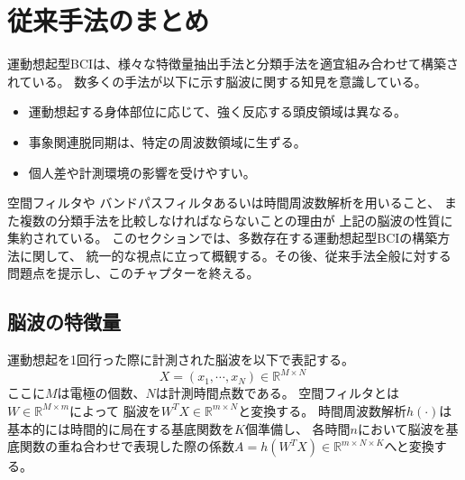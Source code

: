 \section{従来手法のまとめ}
運動想起型BCIは、様々な特徴量抽出手法と分類手法を適宜組み合わせて構築されている。
数多くの手法が以下に示す脳波に関する知見を意識している。
\begin{itemize}
    \item 運動想起する身体部位に応じて、強く反応する頭皮領域は異なる。
    \item 事象関連脱同期は、特定の周波数領域に生ずる。
    \item 個人差や計測環境の影響を受けやすい。
\end{itemize}
空間フィルタや
バンドパスフィルタあるいは時間周波数解析を用いること、
また複数の分類手法を比較しなければならないことの理由が
上記の脳波の性質に集約されている。
このセクションでは、多数存在する運動想起型BCIの構築方法に関して、
統一的な視点に立って概観する。その後、従来手法全般に対する問題点を提示し、このチャプターを終える。

\subsection{脳波の特徴量}
運動想起を1回行った際に計測された脳波を以下で表記する。
\begin{equation}
    X =(x_1, \cdots, x_N)\in \mathbb{R}^{M \times N}\    
\end{equation}
ここに\(M\)は電極の個数、\(N\)は計測時間点数である。
空間フィルタとは\(W\in \mathbb R^{M \times m}\)によって
脳波を\(W^TX \in \mathbb R^{m \times N}\)と変換する。
時間周波数解析\(h(\cdot)\)は基本的には時間的に局在する基底関数を\(K\)個準備し、
各時間\(n\)において脳波を基底関数の重ね合わせで表現した際の係数\(A = h(W^TX) \in \mathbb R^{m \times N \times K}\)へと変換する。

